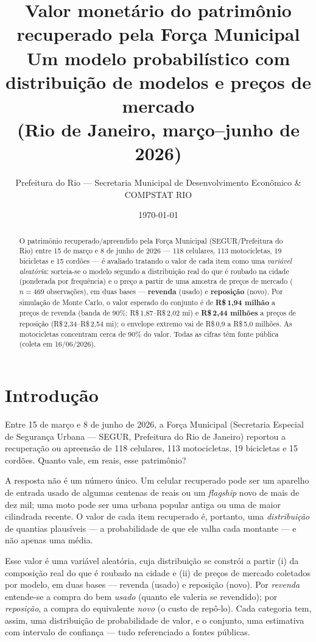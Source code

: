 \documentclass[11pt,a4paper]{article}
\title{\textbf{Valor monetário do patrimônio recuperado pela Força Municipal}\\[0.3em]
\large Um modelo probabilístico com distribuição de modelos e preços de mercado\\(Rio de Janeiro, março--junho de 2026)}
\author{Prefeitura do Rio --- Secretaria Municipal de Desenvolvimento Econômico \& COMPSTAT RIO}
\date{\today}
\newcommand{\reais}[1]{R\$\,#1}
\begin{document}
\maketitle

\begin{abstract}
\noindent O patrimônio recuperado/apreendido pela Força Municipal (SEGUR/Prefeitura do Rio) entre 15
de março e 8 de junho de 2026 --- 118 celulares, 113 motocicletas, 19 bicicletas e 15 cordões --- é
avaliado tratando o valor de cada item como uma \emph{variável aleatória}: sorteia-se o modelo
segundo a distribuição real do que é roubado na cidade (ponderada por frequência) e o preço a partir
de uma amostra de preços de mercado ($n=469$ observações), em duas bases --- \textbf{revenda}
(usado) e \textbf{reposição} (novo). Por simulação de Monte Carlo, o valor esperado do conjunto é de
\textbf{\reais{1{,}94} milhão} a preços de revenda (banda de 90\%: \reais{1{,}87}--\reais{2{,}02}
mi) e \textbf{\reais{2{,}44} milhões} a preços de reposição (\reais{2{,}34}--\reais{2{,}54} mi);
o envelope extremo vai de \reais{0{,}9} a \reais{5{,}0} milhões. As motocicletas concentram cerca
de 90\% do valor. Todas as cifras têm fonte pública (coleta em 16/06/2026).
\end{abstract}

\section{Introdução}
Entre 15 de março e 8 de junho de 2026, a Força Municipal (Secretaria Especial de Segurança
Urbana --- SEGUR, Prefeitura do Rio de Janeiro) reportou a recuperação ou apreensão de 118
celulares, 113 motocicletas, 19 bicicletas e 15 cordões. Quanto vale, em reais, esse patrimônio?

A resposta não é um número único. Um celular recuperado pode ser um aparelho de entrada usado de
algumas centenas de reais ou um \emph{flagship} novo de mais de dez mil; uma moto pode ser uma
urbana popular antiga ou uma de maior cilindrada recente. O valor de cada item recuperado é,
portanto, uma \emph{distribuição} de quantias plausíveis --- a probabilidade de que ele valha cada
montante --- e não apenas uma média.

Esse valor é uma variável aleatória, cuja distribuição se constrói a partir (i) da composição real
do que é roubado na cidade e (ii) de preços de mercado coletados por modelo, em duas bases ---
revenda (usado) e reposição (novo). Por \emph{revenda} entende-se a compra do bem \emph{usado}
(quanto ele valeria se revendido); por \emph{reposição}, a compra do equivalente \emph{novo} (o
custo de repô-lo). Cada categoria tem, assim, uma distribuição de probabilidade de valor, e o
conjunto, uma estimativa com intervalo de confiança --- tudo referenciado a fontes públicas.
\end{document}
